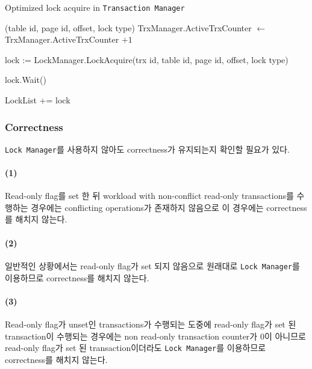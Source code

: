 \documentclass[main.tex]{subfiles}
\begin{document}
\begin{algorithm}
	\caption{Optimized lock acquire in \texttt{Transaction Manager}}
	\begin{algorithmic}
		(table id, page id, offset, lock type)
				\State TrxManager.ActiveTrxCounter $\gets$ TrxManager.ActiveTrxCounter $+ 1$
				\State {}
			\EndIf
			
			\State lock := LockManager.LockAcquire(trx id, table id, page id, offset, lock type)
			
				\State lock.Wait()
			\EndIf
			
			\State LockList += lock
			\State {}
		\EndFunction
	\end{algorithmic}
\end{algorithm}

\subsubsection{Correctness}
\noindent \texttt{Lock Manager}를 사용하지 않아도 correctness가 유지되는지 확인할 필요가 있다.

\paragraph{(1)}
Read-only flag를 set 한 뒤 workload with non-conflict read-only transactions를 수행하는 경우에는 conflicting operations가 존재하지 않음으로 이 경우에는 correctness를 해치지 않는다.

\paragraph{(2)}
일반적인 상황에서는 read-only flag가 set 되지 않음으로 원래대로 \texttt{Lock Manager}를 이용하므로 correctness를 해치지 않는다.

\paragraph{(3)}
Read-only flag가 unset인 transactions가 수행되는 도중에 read-only flag가 set 된 transaction이 수행되는 경우에는 non read-only transaction counter가 0이 아니므로 read-only flag가 set 된 transaction이더라도 \texttt{Lock Manager}를 이용하므로 correctness를 해치지 않는다.
\end{document}
